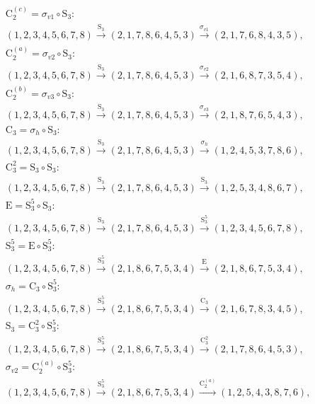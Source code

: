 \begin{align*}
& \mathrm{C}_{2}^{(c)} = \sigma_{v1} \circ \mathrm{S}_{3}:\; \\& (1,2,3,4,5,6,7,8) \xrightarrow{\mathrm{S}_{3}} (2,1,7,8,6,4,5,3) \xrightarrow{\sigma_{v1}} (2,1,7,6,8,4,3,5), \\
& \mathrm{C}_{2}^{(a)} = \sigma_{v2} \circ \mathrm{S}_{3}:\; \\& (1,2,3,4,5,6,7,8) \xrightarrow{\mathrm{S}_{3}} (2,1,7,8,6,4,5,3) \xrightarrow{\sigma_{v2}} (2,1,6,8,7,3,5,4), \\
& \mathrm{C}_{2}^{(b)} = \sigma_{v3} \circ \mathrm{S}_{3}:\; \\& (1,2,3,4,5,6,7,8) \xrightarrow{\mathrm{S}_{3}} (2,1,7,8,6,4,5,3) \xrightarrow{\sigma_{v3}} (2,1,8,7,6,5,4,3), \\
& \mathrm{C}_{3} = \sigma_{h} \circ \mathrm{S}_{3}:\; \\& (1,2,3,4,5,6,7,8) \xrightarrow{\mathrm{S}_{3}} (2,1,7,8,6,4,5,3) \xrightarrow{\sigma_{h}} (1,2,4,5,3,7,8,6), \\
& \mathrm{C}_{3}^{2} = \mathrm{S}_{3} \circ \mathrm{S}_{3}:\; \\& (1,2,3,4,5,6,7,8) \xrightarrow{\mathrm{S}_{3}} (2,1,7,8,6,4,5,3) \xrightarrow{\mathrm{S}_{3}} (1,2,5,3,4,8,6,7), \\
& \mathrm{E} = \mathrm{S}_{3}^{5} \circ \mathrm{S}_{3}:\; \\& (1,2,3,4,5,6,7,8) \xrightarrow{\mathrm{S}_{3}} (2,1,7,8,6,4,5,3) \xrightarrow{\mathrm{S}_{3}^{5}} (1,2,3,4,5,6,7,8), \\
& \mathrm{S}_{3}^{5} = \mathrm{E} \circ \mathrm{S}_{3}^{5}:\; \\& (1,2,3,4,5,6,7,8) \xrightarrow{\mathrm{S}_{3}^{5}} (2,1,8,6,7,5,3,4) \xrightarrow{\mathrm{E}} (2,1,8,6,7,5,3,4), \\
& \sigma_{h} = \mathrm{C}_{3} \circ \mathrm{S}_{3}^{5}:\; \\& (1,2,3,4,5,6,7,8) \xrightarrow{\mathrm{S}_{3}^{5}} (2,1,8,6,7,5,3,4) \xrightarrow{\mathrm{C}_{3}} (2,1,6,7,8,3,4,5), \\
& \mathrm{S}_{3} = \mathrm{C}_{3}^{2} \circ \mathrm{S}_{3}^{5}:\; \\& (1,2,3,4,5,6,7,8) \xrightarrow{\mathrm{S}_{3}^{5}} (2,1,8,6,7,5,3,4) \xrightarrow{\mathrm{C}_{3}^{2}} (2,1,7,8,6,4,5,3), \\
& \sigma_{v2} = \mathrm{C}_{2}^{(a)} \circ \mathrm{S}_{3}^{5}:\; \\& (1,2,3,4,5,6,7,8) \xrightarrow{\mathrm{S}_{3}^{5}} (2,1,8,6,7,5,3,4) \xrightarrow{\mathrm{C}_{2}^{(a)}} (1,2,5,4,3,8,7,6), \\

\end{align*}
